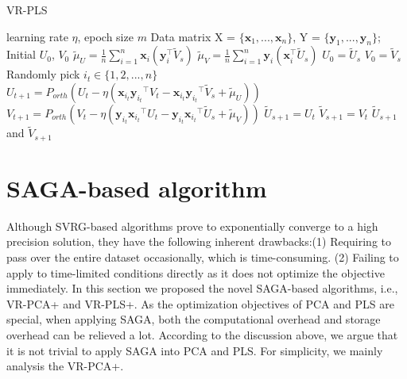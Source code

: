 \documentclass[conference]{IEEEtran}
\begin{document}
  \begin{algorithm}[t]
 	\caption{\textsc{VR-PLS}}
	\label{VR-PLS}
	\begin{algorithmic}[1]
	\Require learning rate $\eta$, epoch size $m$
	\Input Data matrix X = $\{\mathbf{x}_1, ... , \mathbf{x}_n\}$, Y = $\{\mathbf{y}_1, ... , \mathbf{y}_n\}$; Initial $U_0$, $V_0$ 
		\State $\tilde{\mu}_U = \frac{1}{n}\sum\limits_{i=1}^{n}\mathbf{x}_{i}(\mathbf{y}_{i}^{\top}\tilde{V}_{s})$
		\State $\tilde{\mu}_V = \frac{1}{n}\sum\limits_{i=1}^{n}\mathbf{y}_{i}(\mathbf{x}_{i}^{\top}\tilde{U}_{s})$	
		\State $U_0 = \tilde{U}_s$
		\State $V_0 = \tilde{V}_s$
			\State Randomly pick $i_t\in\{1, 2, ..., n\}$
			\State $U_{t+1} = P_{orth}(U_{t} - \eta(\mathbf{x}_{i_t}{\mathbf{y}_{i_t}}^{\top}V_t - \mathbf{x}_{i_t}{\mathbf{y}_{i_t}}^{\top}\tilde{V}_s + \tilde{\mu}_U))$
			\State $V_{t+1} = P_{orth}(V_{t} - \eta(\mathbf{y}_{i_t}{\mathbf{x}_{i_t}}^{\top}U_t - \mathbf{y}_{i_t}{\mathbf{x}_{i_t}}^{\top}\tilde{U}_s + \tilde{\mu}_V))$
		\EndFor
		\State $\tilde{U}_{s+1} = U_{t}$
		\State $\tilde{V}_{s+1} = V_{t}$
	\EndFor
	\State \Return $\tilde{U}_{s+1}$ and $\tilde{V}_{s+1}$
	\end{algorithmic}
\end{algorithm}
 
 

 
 
 \section{SAGA-based algorithm}
 \label{SAGA-based}
 Although SVRG-based algorithms prove to exponentially converge to a high precision solution, they have the following inherent drawbacks:(1) Requiring to pass over the entire dataset occasionally, which is time-consuming. (2)  Failing to apply to time-limited conditions directly as it does not optimize the objective immediately.
 In this section we proposed the novel SAGA-based algorithms, i.e., VR-PCA+ and VR-PLS+.
 As the optimization objectives  of PCA and PLS are special, when applying SAGA, both the computational overhead and storage overhead can be relieved a lot. 
 According to the discussion above, we argue that it is not trivial to apply SAGA into PCA and PLS. For simplicity, we mainly analysis the VR-PCA+.
 
\end{document}
